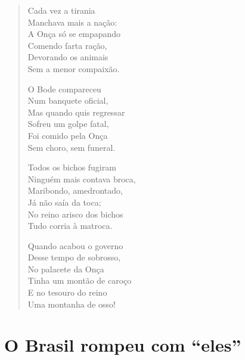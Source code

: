 \begin{verse}
Cada vez a tirania\\
Manchava mais a nação:\\
A Onça só se empapando\\
Comendo farta ração,\\
Devorando os animais\\
Sem a menor compaixão.

O Bode compareceu\\
Num banquete oficial,\\
Mas quando quis regressar\\
Sofreu um golpe fatal,\\
Foi comido pela Onça\\
Sem choro, sem funeral.
\pagebreak

Todos os bichos fugiram\\
Ninguém mais contava broca,\\
Maribondo, amedrontado,\\
Já não saía da toca;\\
No reino arisco dos bichos\\
Tudo corria à matroca.

Quando acabou o governo\\
Desse tempo de sobrosso,\\
No palacete da Onça\\
Tinha um montão de caroço\\
E no tesouro do reino\\
Uma montanha de osso!
\end{verse}

\chapter{O Brasil rompeu com “eles”}

